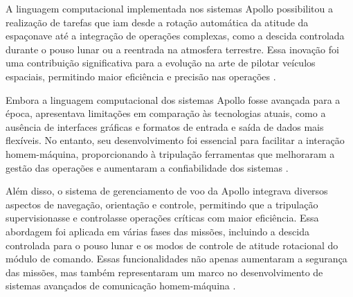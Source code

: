A linguagem computacional implementada nos sistemas Apollo possibilitou a realização de tarefas que iam desde a rotação automática da atitude da espaçonave até a integração de operações complexas, como a descida controlada durante o pouso lunar ou a reentrada na atmosfera terrestre. Essa inovação foi uma contribuição significativa para a evolução na arte de pilotar veículos espaciais, permitindo maior eficiência e precisão nas operações \cite{nevins1971}.

Embora a linguagem computacional dos sistemas Apollo fosse avançada para a época, apresentava limitações em comparação às tecnologias atuais, como a ausência de interfaces gráficas e formatos de entrada e saída de dados mais flexíveis. No entanto, seu desenvolvimento foi essencial para facilitar a interação homem-máquina, proporcionando à tripulação ferramentas que melhoraram a gestão das operações e aumentaram a confiabilidade dos sistemas \cite{nevins1971}.

Além disso, o sistema de gerenciamento de voo da Apollo integrava diversos aspectos de navegação, orientação e controle, permitindo que a tripulação supervisionasse e controlasse operações críticas com maior eficiência. Essa abordagem foi aplicada em várias fases das missões, incluindo a descida controlada para o pouso lunar e os modos de controle de atitude rotacional do módulo de comando. Essas funcionalidades não apenas aumentaram a segurança das missões, mas também representaram um marco no desenvolvimento de sistemas avançados de comunicação homem-máquina \cite{nevins1971}.

